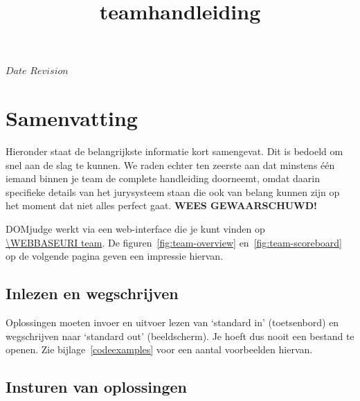

\usepackage[dutch]{babel}

\renewcommand{\versionrevison}{Versie/revisie}
\renewcommand{\lastmodified}{Laatst gewijzigd}
\renewcommand{\generated}{Gegenereerd}

\SVN $Date$
\SVN $Revision$

\title{\DOMjudge teamhandleiding}




\titlestuff{\DOMJUDGEVERSION}{\SVNRevision}{\SVNDate}{\today}

\section*{Samenvatting}

Hieronder staat de belangrijkste informatie kort samengevat. Dit is
bedoeld om snel aan de slag te kunnen. We raden echter ten zeerste
aan dat minstens \'e\'en iemand binnen je team de complete handleiding
doorneemt, omdat daarin specifieke details van het jurysysteem staan
die ook van belang kunnen zijn op het moment dat niet alles perfect
gaat. \textbf{WEES GEWAARSCHUWD!}

DOMjudge werkt via een web-interface die je kunt vinden op \\
\url{\WEBBASEURI team}. De figuren~\ref{fig:team-overview}
en~\ref{fig:team-scoreboard} op de volgende pagina geven een impressie
hiervan.

\subsection*{Inlezen en wegschrijven}

Oplossingen moeten invoer en uitvoer lezen van `standard in'
(toetsenbord) en wegschrijven naar `standard out' (beeldscherm). Je
hoeft dus nooit een bestand te openen. Zie bijlage~\ref{codeexamples}
voor een aantal voorbeelden hiervan.

\subsection*{Insturen van oplossingen}

